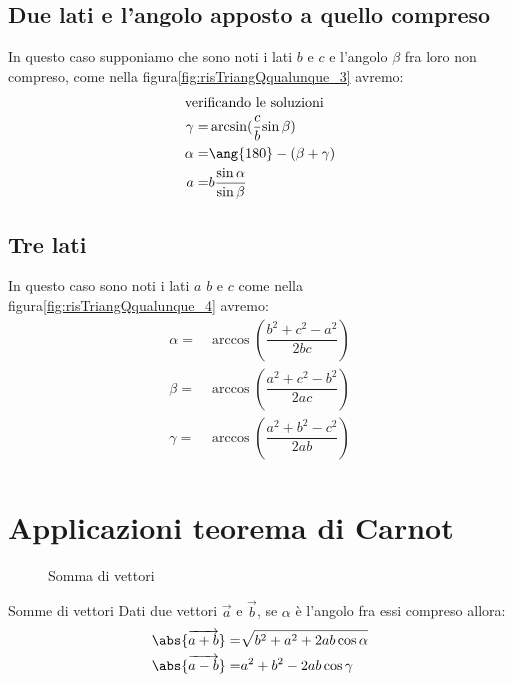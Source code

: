\subsection{Due lati e l'angolo apposto a quello compreso}
In questo caso supponiamo che sono noti i lati $b$ e $c$ e l'angolo $\beta$ fra loro non compreso, come nella figura\nobs\vref{fig:risTriangQqualunque_3} avremo:
\begin{align*}
\intertext{verificando le soluzioni}
\gamma=&\arcsin(\dfrac{c}{b}{\sin\beta}) \\
\alpha=&\ang{180}-(\beta+\gamma)\\
a=&b\dfrac{\sin\alpha}{\sin\beta}
\end{align*}
\subsection{Tre lati}
In questo caso sono noti i lati $a$ $b$ e $c$  come nella figura\nobs\vref{fig:risTriangQqualunque_4} avremo:
\begin{align*}
\alpha=&\arccos(\dfrac{b^2+c^2-a^2}{2bc})\\
\beta=&\arccos(\dfrac{a^2+c^2-b^2}{2ac})\\
\gamma=&\arccos(\dfrac{a^2+b^2-c^2}{2ab})\\
\end{align*}
\section{Applicazioni teorema di Carnot}
\begin{figure}
	\centering
	
	\caption{Somma di vettori}
	\label{fig:parasommavettori}
\end{figure}
\begin{teoremat}{Somme di vettori}{}
	Dati due vettori $\vec{a}$ e $\vec{b}$, se $\alpha$ è l'angolo fra essi compreso allora:
	\begin{align*}
	\abs{\overrightarrow{a+b}}=&\sqrt{b^2+a^2+2ab\cos\alpha}\\
	\abs{\overrightarrow{a-b}}=&a^2+b^2-2ab\cos\gamma
	\end{align*}
\end{teoremat}